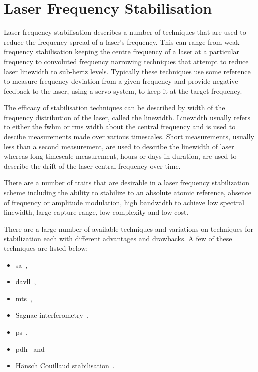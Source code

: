 \section{Laser Frequency Stabilisation}

Laser frequency stabilisation describes a number of techniques that are used to reduce the frequency spread of a laser's frequency.
This can range from weak frequency stabilisation keeping the centre frequency of a laser at a particular frequency to convoluted frequency narrowing techniques that attempt to reduce laser linewidth to sub-hertz levels.
Typically these techniques use some reference to measure frequency deviation from a given frequency and provide negative feedback to the laser, using a servo system, to keep it at the target frequency.

The efficacy of stabilisation techniques can be described by width of the frequency distribution of the laser, called the linewidth.
Linewidth usually refers to either the \gls{fwhm} or \gls{rms} width about the central frequency and is used to descibe measurements made over various timescales.
Short measurements, usually less than a second measurement, are used to describe the linewidth of laser whereas long timescale measurement, hours or days in duration, are used to describe the drift of the laser central frequency over time.

There are a number of traits that are desirable in a laser frequency stabilization scheme including the ability to stabilize to an absolute atomic reference, absence of frequency or amplitude modulation, high bandwidth to achieve low spectral linewidth, large capture range, low complexity and low cost.

There are a large number of available techniques and variations on techniques for stabilization each with different advantages and drawbacks.
A few of these techniques are listed below:
\begin{itemize}
\item \gls{sa}~\cite{haroche_theory_1972, maguire_theoretical_2006, cuneo_optically_1994, preston_doppler-free_1996, saliba_linewidths_2009},
\item \gls{davll}~\cite{corwin_frequency-stabilized_1998, millett-sikking_davll_2007},
\item \gls{mts}~\cite{shirley_modulation_1982, mccarron_modulation_2008, xiang-hui_ultra-stable_2009,negnevitsky_wideband_2013},
\item Sagnac interferometry~\cite{robins_Interferometric_2002, jundt_non-linear_2003},
\item \acrfull{ps}~\cite{wieman_doppler-free_1976, lancaster_polarisation_1999, yoshikawa_frequency_2003, harris_polarization_2006, pearman_polarization_2002, tiwari_laser_2006, do_polarization_2008, torii_laser-phase_2012},
\item \gls{pdh}~\cite{drever_laser_1983} and
\item H\"ansch Couillaud stabilisation~\cite{hansch_laser_1980}.
\end{itemize}

